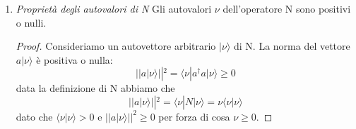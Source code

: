 \begin{enumerate}
	\item \textit{Propriet\`a degli autovalori di N}
	\newline
	Gli autovalori $\nu$ dell'operatore N sono positivi o nulli.
	\begin{proof}
		Consideriamo un autovettore arbitrario $|\nu \rangle$ di N. La norma del vettore $a |\nu \rangle $ \`e positiva o nulla:
		\begin{equation*}
			||a |\nu \rangle||^2 = \langle \nu | a^\dag a|\nu \rangle \geq 0
		\end{equation*}
		data la definizione di N abbiamo che 
		\begin{equation*}
			||a|\nu \rangle||^2 = \langle \nu|N|\nu \rangle = \nu \langle \nu|\nu \rangle 
		\end{equation*}
		dato che $\langle \nu | \nu \rangle > 0$ e $||a|\nu \rangle||^2 \geq 0$ per forza di cosa $\nu \geq 0$.
		 

\end{proof}
\end{enumerate}
